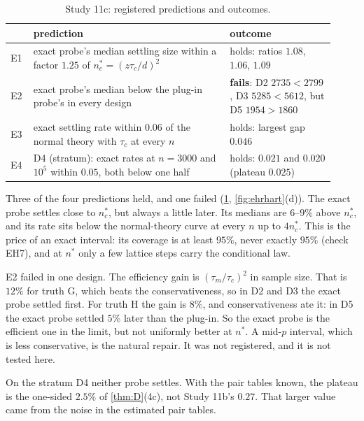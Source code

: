 \begin{table}[!htbp]\centering\small
\begin{tabular}{p{0.06\linewidth}p{0.56\linewidth}p{0.30\linewidth}}\toprule
& prediction & outcome\\\midrule
E1 & exact probe's median settling size within a factor $1.25$ of $n^*_c=(z\tau_c/d)^2$ & holds: ratios $1.08$, $1.06$, $1.09$\\
E2 & exact probe's median below the plug-in probe's in every design & \textbf{fails}: D2 $2735<2799$, D3 $5285<5612$, but D5 $1954>1860$\\
E3 & exact settling rate within $0.06$ of the normal theory with $\tau_c$ at every $n$ & holds: largest gap $0.046$\\
E4 & D4 (stratum): exact rates at $n=3000$ and $10^5$ within $0.05$, both below one half & holds: $0.021$ and $0.020$ (plateau $0.025$)\\\bottomrule
\end{tabular}
\caption{Study 11c: registered predictions and outcomes.}\label{tab:study11c}
\end{table}

Three of the four predictions held, and one failed (\cref{tab:study11c}, \cref{fig:ehrhart}(d)). The exact probe settles close to
$n^*_c$, but always a little later. Its medians are $6$--$9\%$ above $n^*_c$, and its rate sits below the normal-theory curve at every
$n$ up to $4n^*_c$. This is the price of an exact interval: its coverage is at least $95\%$, never exactly $95\%$ (check EH7), and at
$n^*$ only a few lattice steps carry the conditional law.

E2 failed in one design. The efficiency gain is $(\tau_m/\tau_c)^2$ in sample size. That is $12\%$ for truth G, which beats the
conservativeness, so in D2 and D3 the exact probe settled first. For truth H the gain is $8\%$, and conservativeness ate it: in D5 the
exact probe settled $5\%$ later than the plug-in. So the exact probe is the efficient one in the limit, but not uniformly better at
$n^*$. A mid-$p$ interval, which is less conservative, is the natural repair. It was not registered, and it is not tested here.

On the stratum D4 neither probe settles. With the pair tables known, the plateau is the one-sided $2.5\%$ of \cref{thm:D}(4c), not
Study 11b's $0.27$. That larger value came from the noise in the estimated pair tables.

